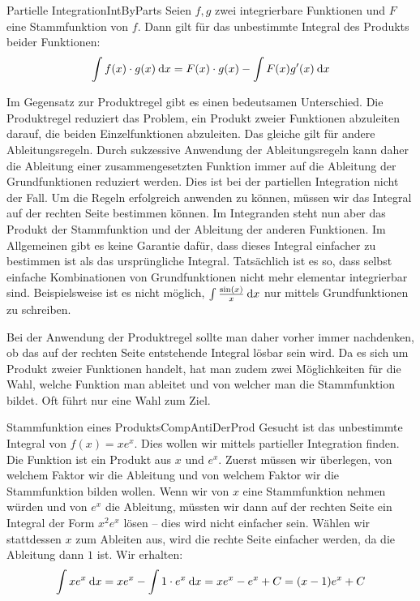 \begin{definition}{Partielle Integration}{IntByParts}
    Seien $f,g$ zwei integrierbare Funktionen und $F$ eine Stammfunktion von $f$. Dann gilt für das unbestimmte Integral des Produkts beider Funktionen:
    $$
      \int f(x) \cdot g(x) \:\mathrm{d}{x} = F(x) \cdot g(x) - \int F(x) g'(x) \:\mathrm{d}{x}
    $$
\end{definition}

Im Gegensatz zur Produktregel gibt es einen bedeutsamen Unterschied. Die Produktregel reduziert das Problem, ein Produkt zweier Funktionen abzuleiten darauf, die beiden Einzelfunktionen abzuleiten. Das gleiche gilt für andere Ableitungsregeln. Durch sukzessive Anwendung der Ableitungsregeln kann daher die Ableitung einer zusammengesetzten Funktion immer auf die Ableitung der Grundfunktionen reduziert werden. Dies ist bei der partiellen Integration nicht der Fall. Um die Regeln erfolgreich anwenden zu können, müssen wir das Integral auf der rechten Seite bestimmen können. Im Integranden steht nun aber das Produkt der Stammfunktion und der Ableitung der anderen Funktionen. Im Allgemeinen gibt es keine Garantie dafür, dass dieses Integral einfacher zu bestimmen ist als das ursprüngliche Integral. Tatsächlich ist es so, dass selbst einfache Kombinationen von Grundfunktionen nicht mehr elementar integrierbar sind. Beispielsweise ist es nicht möglich, $\int \frac{\sin(x)}{x} \:\mathrm{d}{x}$ nur mittels Grundfunktionen zu schreiben.

Bei der Anwendung der Produktregel sollte man daher vorher immer nachdenken, ob das auf der rechten Seite entstehende Integral lösbar sein wird. Da es sich um Produkt zweier Funktionen handelt, hat man zudem zwei Möglichkeiten für die Wahl, welche Funktion man ableitet und von welcher man die Stammfunktion bildet. Oft führt nur eine Wahl zum Ziel.

\begin{example}{Stammfunktion eines Produkts}{CompAntiDerProd}
    Gesucht ist das unbestimmte Integral von $f(x) = x e^x$. Dies wollen wir mittels partieller Integration finden. Die Funktion ist ein Produkt aus $x$ und $e^x$. Zuerst müssen wir überlegen, von welchem Faktor wir die Ableitung und von welchem Faktor wir die Stammfunktion bilden wollen. Wenn wir von $x$ eine Stammfunktion nehmen würden und von $e^x$ die Ableitung, müssten wir dann auf der rechten Seite ein Integral der Form $x^2 e^x$ lösen -- dies wird nicht einfacher sein. Wählen wir stattdessen $x$ zum Ableiten aus, wird die rechte Seite einfacher werden, da die Ableitung dann $1$ ist. Wir erhalten:
    $$
        \int x e^x \:\mathrm{d}{x} = x e^x - \int 1 \cdot e^x \:\mathrm{d}{x} = xe^x-e^x + C = (x-1) e^x + C
    $$
\end{example}

